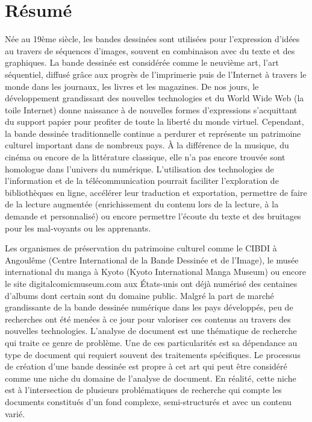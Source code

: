 \chapter*{R{\'e}sum{\'e}}

Née au 19ème siècle, les bandes dessinées sont utilisées pour l'expression d'idées au travers de séquences d'images, souvent en combinaison avec du texte et des graphiques.
La bande dessinée est considérée comme le neuvième art, l'art séquentiel, diffusé grâce aux progrès de l'imprimerie puis de l'Internet à travers le monde dans les journaux, les livres et les magazines.
De nos jours, le développement grandissant des nouvelles technologies et du World Wide Web (la toile Internet) donne naissance à de nouvelles formes d'expressions s'acquittant du support papier pour profiter de toute la liberté du monde virtuel.
Cependant, la bande dessinée traditionnelle continue a perdurer et représente un patrimoine culturel important dans de nombreux pays.
À la différence de la musique, du cinéma ou encore de la littérature classique, elle n'a pas encore trouvée sont homologue dans l'univers du numérique.
L'utilisation des technologies de l'information et de la télécommunication pourrait faciliter l'exploration de bibliothèques en ligne, accélérer leur traduction et exportation, permettre de faire de la lecture augmentée (enrichissement du contenu lors de la lecture, à la demande et personnalisé) ou encore permettre l'écoute du texte et des bruitages pour les mal-voyants ou les apprenants.

Les organismes de préservation du patrimoine culturel comme le CIBDI à Angoulême (Centre International de la Bande Dessinée et de l'Image), le musée international du manga à Kyoto (Kyoto International Manga Museum) ou encore le site digitalcomicmuseum.com aux États-unis ont déjà numérisé des centaines d'albums dont certain sont du domaine public.
Malgré la part de marché grandissante de la bande dessinée numérique dans les pays développés, peu de recherches ont été menées à ce jour pour valoriser ces contenus au travers des nouvelles technologies.
L'analyse de document est une thématique de recherche qui traite ce genre de problème.
Une de ces particularités est sa dépendance au type de document qui requiert souvent des traitements spécifiques.
Le processus de création d'une bande dessinée est propre à cet art qui peut être considéré comme une niche du domaine de l'analyse de document.
En réalité, cette niche est à l'intersection de plusieurs problématiques de recherche qui compte les documents constitués d'un fond complexe, semi-structurés et avec un contenu varié.

